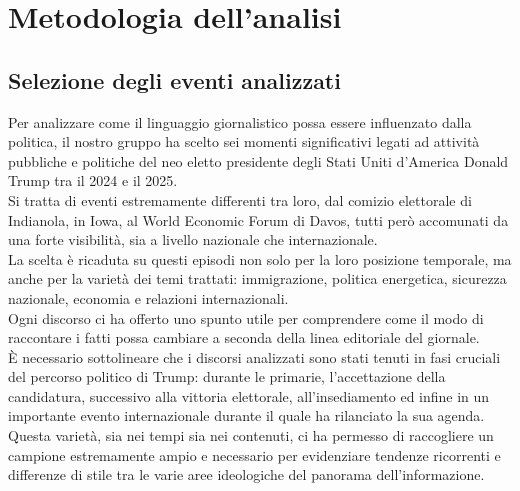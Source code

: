 \chapter{Metodologia dell’analisi}

\section{Selezione degli eventi analizzati}
Per analizzare come il linguaggio giornalistico possa essere influenzato dalla politica, il nostro gruppo ha scelto sei momenti significativi legati ad attività pubbliche e politiche del neo eletto presidente degli Stati Uniti d'America Donald Trump tra il 2024 e il 2025.\\
Si tratta di eventi estremamente differenti tra loro, dal comizio elettorale di Indianola, in Iowa, al World Economic Forum di Davos, tutti però accomunati da una forte visibilità, sia a livello nazionale che internazionale. \\
La scelta è ricaduta su questi episodi non solo per la loro posizione temporale, ma anche per la varietà dei temi trattati: immigrazione, politica energetica, sicurezza nazionale, economia e relazioni internazionali. \\
Ogni discorso ci ha offerto uno spunto utile per comprendere come il modo di raccontare i fatti possa cambiare a seconda della linea editoriale del giornale. \\
È necessario sottolineare che i discorsi analizzati sono stati tenuti in fasi cruciali del percorso politico di Trump: durante le primarie, l’accettazione della candidatura, successivo alla vittoria elettorale, all’insediamento ed infine in un importante evento internazionale durante il quale ha rilanciato la sua agenda. \\
Questa varietà, sia nei tempi sia nei contenuti, ci ha permesso di raccogliere un campione estremamente ampio e necessario per evidenziare tendenze ricorrenti e differenze di stile tra le varie aree ideologiche del panorama dell’informazione.\\

